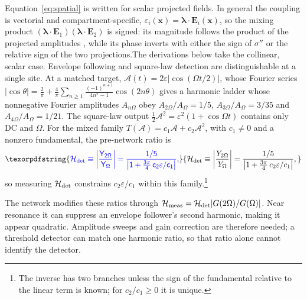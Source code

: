 \documentclass[11pt,a4paper]{article}
\newcommand{\Sig}{\sigma}
\newcommand{\half}{\tfrac{1}{2}}
\providecommand{\DIFaddtex}[1]{{\protect\color{blue} \sf #1}} %
\providecommand{\DIFdeltex}[1]{{\protect\color{red} \scriptsize #1}} %
\providecommand{\DIFaddbegin}{} %
\providecommand{\DIFaddend}{} %
\providecommand{\DIFdelbegin}{} %
\providecommand{\DIFdelend}{} %
\providecommand{\DIFadd}[1]{\texorpdfstring{\DIFaddtex{#1}}{#1}} %
\providecommand{\DIFdel}[1]{\texorpdfstring{\DIFdeltex{#1}}{}} %
\begin{document}
\DIFdelbegin \DIFdel{Equation~\eqref{eq:spatial} is written for scalar projected fields. In general the coupling is vectorial and compartment-specific, $\varepsilon_i(\mathbf{x})=\boldsymbol{\lambda}\!\cdot\!\mathbf{E}_i(\mathbf{x})$, so the
mixing product $(\boldsymbol{\lambda}\!\cdot\!\mathbf{E}_1)
(\boldsymbol{\lambda}\!\cdot\!\mathbf{E}_2)$ is signed: its magnitude follows the
product
of the projected amplitudes , while its phase inverts with
either the
sign of $\Sig''$ or
the relative sign of the two projections.The derivations below take the collinear,
scalar case. }\DIFdelend \DIFaddbegin \DIFadd{Envelope following and square-law detection are distinguishable at a single site. At a matched target,
$\mathcal A(t)=2\varepsilon|\cos(\Omega t/2)|$, whose Fourier series
$|\cos\theta|=\tfrac2\pi+\tfrac4\pi\sum_{n\ge1}\tfrac{(-1)^{n+1}}{4n^2-1}\cos(2n\theta)$ gives a
harmonic ladder whose nonnegative Fourier amplitudes $A_{n\Omega}$ obey $A_{2\Omega}/A_\Omega=1/5$, $A_{3\Omega}/A_\Omega=3/35$ and
$A_{4\Omega}/A_\Omega=1/21$. The square-law output $\half \mathcal A^2=\varepsilon^2(1+\cos\Omega
t)$ contains only DC and $\Omega$. For the mixed family $T(\mathcal A)=c_1\mathcal A+c_2\mathcal A^2$, with
$c_1\ne0$ and a nonzero fundamental, the
pre-network ratio is
}\begin{equation}
\DIFadd{\mathcal H_{\rm det}\equiv\left|\frac{Y_{2\Omega}}{Y_\Omega}\right|
=\frac{1/5}{\left|1+\tfrac{3\pi}{4}\,c_2\varepsilon/c_1\right|},
\label{eq:rdet}
}\end{equation}
\DIFadd{so measuring $\mathcal H_{\rm det}$ constrains $c_2\varepsilon/c_1$ within this family.}\footnote{\DIFadd{The inverse has two branches unless the sign of the fundamental
relative to the linear term is known; for $c_2/c_1\ge0$ it is unique.}}
\DIFaddend

\DIFaddbegin \fi

\DIFadd{The network modifies these ratios through
$\mathcal H_{\rm meas}=\mathcal H_{\rm det}|G(2\Omega)/G(\Omega)|$.
Near resonance it can suppress an envelope follower's second harmonic,
making it appear quadratic. Amplitude sweeps and gain correction are
therefore needed; a threshold detector can match one harmonic ratio, so that
ratio alone cannot identify the detector.
}
\end{document}
